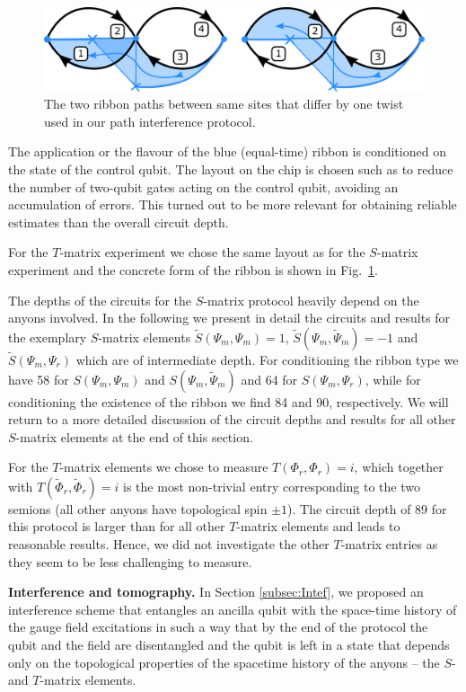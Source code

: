 \documentclass[a4paper,twocolumn,11pt]{quantumarticle}
\begin{document}
\begin{figure}
	\centering
	\includegraphics[width=\linewidth]{Figures/t-mat_ribs.pdf}
	\caption{The two ribbon paths between same sites that differ by one twist used in our path interference protocol.}
	\label{fig:T_intef_setup}
\end{figure}
The application or the flavour of the blue (equal-time) ribbon is conditioned on the state of the control qubit.
The layout on the chip is chosen such as to reduce the number of two-qubit gates acting on the control qubit, avoiding an accumulation of errors. This turned out to be more relevant for obtaining reliable estimates than the overall circuit depth. 

For the $T$-matrix experiment we chose the same layout as for the $S$-matrix experiment and the concrete form of the ribbon is shown in Fig.~\ref{fig:T_intef_setup}.

The depths of the circuits for the $S$-matrix protocol heavily depend on the anyons involved.
In the following we present in detail the circuits and results for the exemplary $S$-matrix elements $\tilde{S}(\Psi_m, \Psi_m)=1$, $\tilde{S}(\Psi_m, \tilde{\Psi}_m)=-1$ and $\tilde{S}(\Psi_m, \Psi_r)$ which are of intermediate depth. For conditioning the ribbon type we have 58 for $S(\Psi_m, \Psi_m)$ and $S(\Psi_m, \tilde{\Psi}_m)$	 and 64  for $S(\Psi_m, \Psi_r)$, while for conditioning the existence of the ribbon we find 84 and 90, respectively. We will return to a more detailed discussion of the circuit depths and results for all other $S$-matrix elements at the end of this section.

For the $T$-matrix elements we chose to measure $T(\Phi_r,\Phi_r)=i$, which together with $T(\tilde{\Phi}_r,\tilde{\Phi}_r)=i$ is the most non-trivial entry corresponding to the two semions (all other anyons have topological spin $\pm 1$). The circuit depth of 89 for this protocol is larger than for all other $T$-matrix elements and leads to reasonable results. Hence, we did not investigate the other $T$-matrix entries as they seem to be less challenging to measure.

\textbf{Interference and tomography.}
In Section \ref{subsec:Intef}, we proposed an interference scheme that entangles an ancilla qubit with the space-time history of the gauge field excitations in such a way that by the end of the protocol the qubit and the field are disentangled and the qubit is left in a state that depends only on the topological properties of the spacetime history of the anyons -- the $S$- and $T$-matrix elements.
\end{document}

